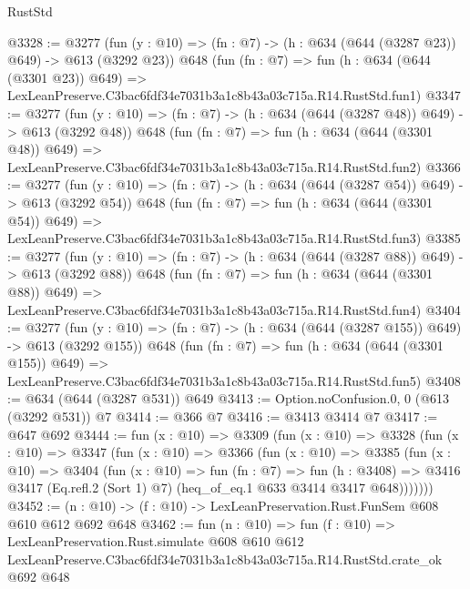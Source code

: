 \begin{lexlean}{RustStd}
\begin{coremodule}
@3328 := @3277
    (fun (y : @10) => (fn : @7) -> (h : @634 (@644 (@3287 @23)) @649) -> @613 (@3292 @23))
    @648
    (fun (fn : @7) =>
    fun (h : @634 (@644 (@3301 @23)) @649) =>
    LexLeanPreserve.C3bac6fdf34e7031b3a1c8b43a03c715a.R14.RustStd.fun1)
@3347 := @3277
    (fun (y : @10) => (fn : @7) -> (h : @634 (@644 (@3287 @48)) @649) -> @613 (@3292 @48))
    @648
    (fun (fn : @7) =>
    fun (h : @634 (@644 (@3301 @48)) @649) =>
    LexLeanPreserve.C3bac6fdf34e7031b3a1c8b43a03c715a.R14.RustStd.fun2)
@3366 := @3277
    (fun (y : @10) => (fn : @7) -> (h : @634 (@644 (@3287 @54)) @649) -> @613 (@3292 @54))
    @648
    (fun (fn : @7) =>
    fun (h : @634 (@644 (@3301 @54)) @649) =>
    LexLeanPreserve.C3bac6fdf34e7031b3a1c8b43a03c715a.R14.RustStd.fun3)
@3385 := @3277
    (fun (y : @10) => (fn : @7) -> (h : @634 (@644 (@3287 @88)) @649) -> @613 (@3292 @88))
    @648
    (fun (fn : @7) =>
    fun (h : @634 (@644 (@3301 @88)) @649) =>
    LexLeanPreserve.C3bac6fdf34e7031b3a1c8b43a03c715a.R14.RustStd.fun4)
@3404 := @3277
    (fun (y : @10) => (fn : @7) -> (h : @634 (@644 (@3287 @155)) @649) -> @613 (@3292 @155))
    @648
    (fun (fn : @7) =>
    fun (h : @634 (@644 (@3301 @155)) @649) =>
    LexLeanPreserve.C3bac6fdf34e7031b3a1c8b43a03c715a.R14.RustStd.fun5)
@3408 := @634 (@644 (@3287 @531)) @649
@3413 := Option.noConfusion.{0, 0} (@613 (@3292 @531)) @7
@3414 := @366 @7
@3416 := @3413 @3414 @7
@3417 := @647 @692
@3444 := fun (x : @10) =>
  @3309
    (fun (x : @10) =>
    @3328
      (fun (x : @10) =>
      @3347
        (fun (x : @10) =>
        @3366
          (fun (x : @10) =>
          @3385
            (fun (x : @10) =>
            @3404
              (fun (x : @10) =>
              fun (fn : @7) =>
              fun (h : @3408) =>
              @3416 @3417 (Eq.refl.{2} (Sort 1) @7) (heq_of_eq.{1} @633 @3414 @3417 @648)))))))
@3452 := (n : @10) -> (f : @10) -> LexLeanPreservation.Rust.FunSem @608 @610 @612 @692 @648
@3462 := fun (n : @10) =>
  fun (f : @10) =>
  LexLeanPreservation.Rust.simulate
    @608
    @610
    @612
    LexLeanPreserve.C3bac6fdf34e7031b3a1c8b43a03c715a.R14.RustStd.crate_ok
    @692
    @648
\end{coremodule}
\end{lexlean}
